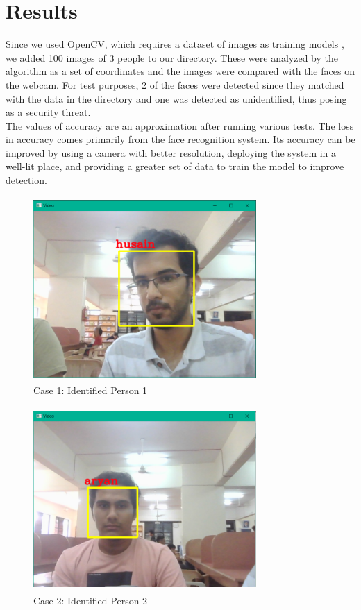 \documentclass[conference]{IEEEtran}
\begin{document}
	\section{Results}
	Since we used OpenCV, which requires a dataset of images as training models \cite{f}, we added 100 images of 3 people to our directory. These were analyzed by the algorithm as a set of coordinates and the images were compared with the faces on the webcam. For test purposes, 2 of the faces were detected since they matched with the data in the directory and one was detected as unidentified, thus posing as a security threat.\\
		The values of accuracy are an approximation after running various tests. The loss in accuracy comes primarily from the face recognition system. Its accuracy can be improved by using a camera with better resolution, deploying the system in a well-lit place, and providing a greater set of data to train the model to improve detection.\\
	\begin{figure}
		\centering
		\includegraphics[width=8.5cm, height=7cm]{Husain.png}
		\caption{\label{fig:The-caption}Case 1: Identified Person 1}
	\end{figure}
	\begin{figure}
		\centering
		\includegraphics[width=8.5cm, height=7cm]{Aryan.png}
		\caption{\label{fig:The-caption}Case 2: Identified Person 2}
	\end{figure}
\end{document}
